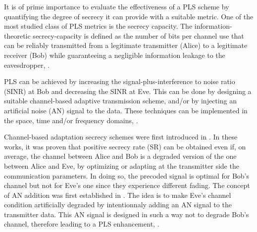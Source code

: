 \documentclass[12pt, draftclsnofoot, onecolumn]{IEEEtran}
\begin{document}
It is of prime importance to evaluate the effectiveness of a PLS scheme by quantifying the degree of secrecy it can provide with a suitable metric. One of the most studied class of PLS metrics is the secrecy capacity. The information-theoretic secrecy-capacity is defined as the number of bits per channel use that can be reliably transmitted from a legitimate transmitter (Alice) to a legitimate receiver (Bob) while guaranteeing a negligible information leakage to the eavesdropper, \cite{bloch_barros_2011}.

 PLS can be achieved by increasing the signal-plus-interference to noise ratio (SINR) at Bob and decreasing the SINR at Eve. This can be done by designing a suitable channel-based adaptive transmission scheme, and/or by injecting an artificial noise (AN) signal to the data. These techniques can be implemented in the space, time and/or frequency domains, \cite{8509094,7762075,MELKI20191}.

Channel-based adaptation secrecy schemes were first introduced in \cite{4529264,4529282,4626059}. In these works, it was proven that positive secrecy rate (SR) can be obtained even if, on average, the channel between Alice and Bob is a degraded version of the one between Alice and Eve, by optimizing or adapting at the transmitter side the communication parameters. In doing so, the precoded signal is optimal for Bob's channel but not for Eve's one since they experience different fading. The concept of AN addition was first established in \cite{1558439,1605889,4543070}. The idea is to make Eve's channel condition artificially degraded by intentionnaly adding an AN signal to the transmitter data. This AN signal is designed in such a way not to degrade Bob's channel, therefore leading to a PLS enhancement, \cite{8509094}.
\end{document}
